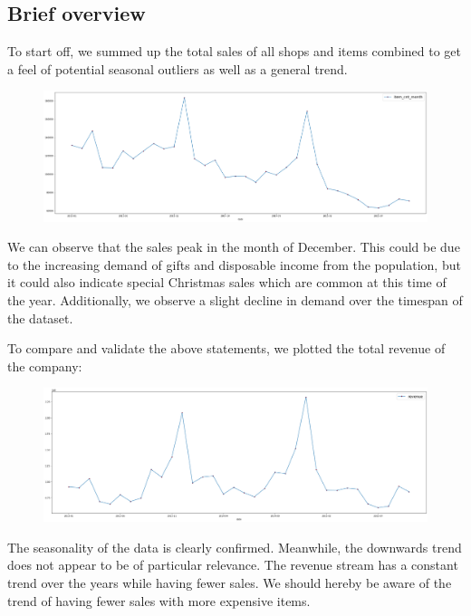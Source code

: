 \subsection{Brief overview}

To start off, we summed up the total sales of all shops and items combined to get a feel of potential seasonal outliers as well as a general trend.

\begin{figure}[h]
  \centering
  \includegraphics[width=0.9\linewidth]{external_content/graphs/total_sales.png}
  \captionsetup{justification=centering}
  \label{fig:total_sales}
\end{figure}


We can observe that the sales peak in the month of December. This could be due to the increasing demand of gifts and disposable income from the population, but it could also indicate special Christmas sales which are common at this time of the year. Additionally, we observe a slight decline in demand over the timespan of the dataset.

To compare and validate the above statements, we plotted the total revenue of the company:

\begin{figure}[h]
  \centering
  \includegraphics[width=0.9\linewidth]{external_content/graphs/total_revenue.png}
  \captionsetup{justification=centering}
  \label{fig:total_revenue}
\end{figure}

The seasonality of the data is clearly confirmed. Meanwhile, the downwards trend does not appear to be of particular relevance. The revenue stream has a constant trend over the years while having fewer sales. We should hereby be aware of the trend of having fewer sales with more expensive items.
